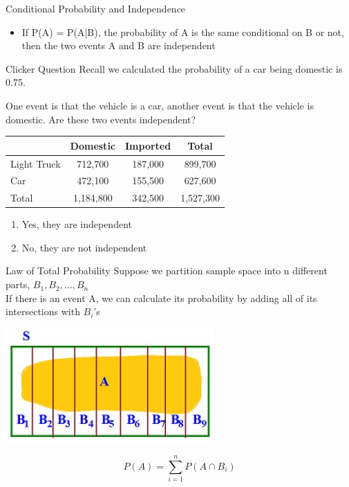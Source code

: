 \documentclass{beamer}
\begin{document}
\begin{frame}{Conditional Probability and Independence}
	
	\begin{itemize}
		\item If P(A) = P(A|B), the probability of A is the same conditional on B or not, then the two events A and B are \alert{independent}
	\end{itemize}
	
\end{frame}

\begin{frame}{Clicker Question}
	Recall we calculated the probability of a car being domestic is 0.75. 
	
	One event is that the vehicle is a car, another event is that the vehicle is domestic. Are these two events independent? 
	
	\begin{center}
		\begin{tabular}{|l|c|c|c|}
			\hline
			& \textbf{Domestic} & \textbf{Imported} & \textbf{Total} \\ \hline \hline
			Light Truck & 712,700 & 187,000 & 899,700 \\ \hline 
			Car & 472,100 & 155,500 & 627,600 \\ \hline 
			Total & 1,184,800 & 342,500 & 1,527,300 \\ \hline
		\end{tabular}
	\end{center}

	\begin{enumerate}[label=(\alph*)]
		\item Yes, they are independent
		\item No, they are not independent
	\end{enumerate}
\end{frame}

\begin{frame}{Law of Total Probability}
	Suppose we partition sample space into n different parts, $B_1, B_2, ..., B_n$\\
	If there is an event A, we can calculate its probability by adding all of its intersections with $B_i$'s
	\begin{center}
		\includegraphics[width=0.6\textwidth]{totalprob}
	\end{center}
	$$P(A)=\sum_{i=1}^nP(A \cap B_i)$$
\end{frame}
\end{document}
